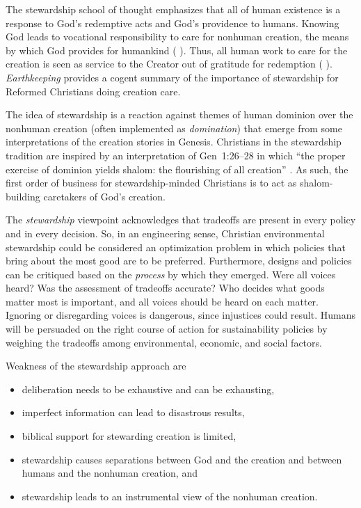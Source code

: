 \documentclass[12pt]{article}
\begin{document}
The stewardship school of thought 
emphasizes that all of human existence
is a response to God's redemptive acts
and God's providence to humans.
Knowing God leads to vocational responsibility 
to care for nonhuman creation,
the means by which God provides for humankind 
(\textcite{Jenkins:2008} \textcite[19]{Jenkins:2008}). 
Thus, all human work to care for the creation 
is seen as service to the Creator
out of gratitude for redemption (\textcite{Jenkins:2008} \textcite[77]{Jenkins:2008}).
\emph{Earthkeeping} \autocite{Wilkenson:1980aa} provides a cogent summary
of the importance of stewardship for Reformed Christians doing creation care.

The idea of stewardship is a reaction 
against themes of human dominion over the nonhuman creation
(often implemented as \emph{domination})
that emerge from some interpretations of the creation stories in Genesis.
Christians in the stewardship tradition are inspired by an interpretation of Gen~1:26–28 in which 
``the proper exercise of dominion yields shalom: the flourishing of all creation'' \autocite{BoumaPrediger:2019}.
As such, the first order of business for stewardship-minded Christians
is to act as shalom-building caretakers of God's creation.

The \emph{stewardship} viewpoint acknowledges that tradeoffs
are present in every policy and in every decision. 
So, in an engineering sense, 
Christian environmental stewardship could be considered an optimization problem
in which policies that bring about the most good 
are to be preferred.
Furthermore, designs and policies can be critiqued 
based on the \emph{process} by which they emerged.
Were all voices heard? Was the assessment of tradeoffs accurate?
Who decides what goods matter most is important, and 
all voices should be heard on each matter.
Ignoring or disregarding voices is dangerous,
since injustices could result.
Humans will be persuaded on the right course of action
for sustainability policies by weighing the tradeoffs 
among environmental, economic, and social factors.

Weakness of the stewardship approach are
%
\begin{itemize}

  \item deliberation needs to be exhaustive and can be exhausting,

  \item imperfect information can lead to disastrous results,
  
  \item biblical support for stewarding creation is limited,
  
  \item stewardship causes separations between God and the creation and between 
        humans and the nonhuman creation, and
		
  \item stewardship leads to an instrumental view of the nonhuman creation.

\end{itemize}
\end{document}
